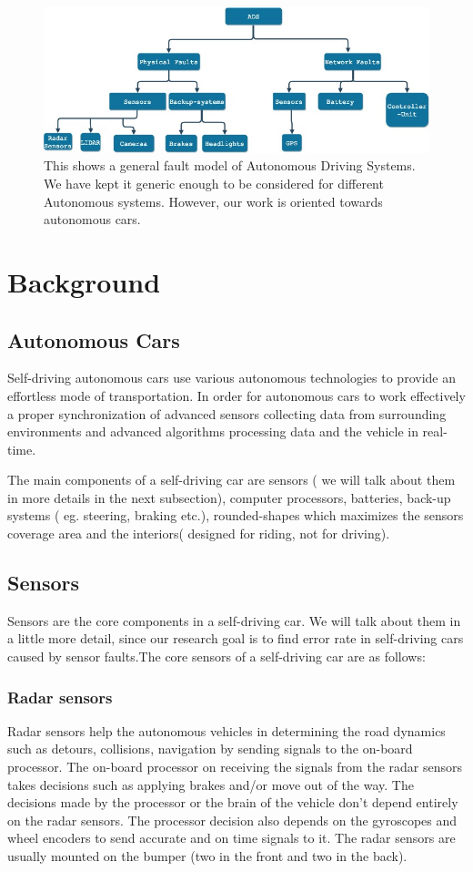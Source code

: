 
\begin{figure}
	\centering
	\includegraphics[width=0.7\linewidth]{Fault-modelgeneral}
	\caption[Fault-model for ADS]{This shows a general fault model of Autonomous Driving Systems. We have kept it generic enough to be considered for different Autonomous systems. However, our work is oriented towards autonomous cars.}
	\label{fig:fault-modelgeneral}
\end{figure}
\section{Background}
\subsection{ Autonomous Cars}
Self-driving autonomous cars use various autonomous technologies to provide an effortless mode of transportation. In order for autonomous cars to work effectively a proper synchronization of advanced sensors collecting data from surrounding environments and advanced algorithms processing data and the vehicle in real-time.

The main components of a self-driving car are sensors ( we will talk about them in more details in the next subsection), computer processors, batteries, back-up systems ( eg. steering, braking etc.), rounded-shapes which maximizes the sensors coverage area and the interiors( designed for riding, not for driving). 

\subsection{Sensors}
Sensors are the core components in a self-driving car. We will talk about them in a little more detail, since our research goal is to find error rate in self-driving cars caused by sensor faults.The core sensors of a self-driving car are as follows:

\smallskip
\subsubsection{Radar sensors}
Radar sensors help the autonomous vehicles in determining the road dynamics such as detours, collisions, navigation by sending signals to the on-board processor. The on-board processor on receiving the signals from the radar sensors takes decisions such as applying brakes and/or move out of the way. The decisions made by the processor or the brain of the vehicle don't depend entirely on the radar sensors. The processor decision also depends on the gyroscopes and  wheel encoders to send accurate and on time signals to it. The radar sensors are usually mounted on the bumper (two in the front and two in the back).

